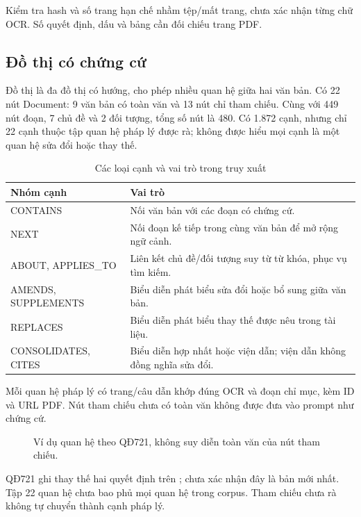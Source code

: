 Kiểm tra hash và số trang hạn chế nhầm tệp/mất trang, chưa xác nhận từng chữ OCR. Số quyết định, dấu và bảng cần đối chiếu trang PDF.

\subsection{Đồ thị có chứng cứ}
Đồ thị là đa đồ thị có hướng, cho phép nhiều quan hệ giữa hai văn bản. Có 22 nút Document: 9 văn bản có toàn văn và 13 nút chỉ tham chiếu. Cùng với 449 nút đoạn, 7 chủ đề và 2 đối tượng, tổng số nút là 480. Có 1.872 cạnh, nhưng chỉ 22 cạnh thuộc tập quan hệ pháp lý được rà; không được hiểu mọi cạnh là một quan hệ sửa đổi hoặc thay thế.

\begin{table}[H]
\centering\small
\caption{Các loại cạnh và vai trò trong truy xuất}
\begin{tabularx}{\textwidth}{l X}
\toprule Nhóm cạnh & Vai trò\\
\midrule
CONTAINS & Nối văn bản với các đoạn có chứng cứ.\\
NEXT & Nối đoạn kế tiếp trong cùng văn bản để mở rộng ngữ cảnh.\\
ABOUT, APPLIES\_TO & Liên kết chủ đề/đối tượng suy từ từ khóa, phục vụ tìm kiếm.\\
AMENDS, SUPPLEMENTS & Biểu diễn phát biểu sửa đổi hoặc bổ sung giữa văn bản.\\
REPLACES & Biểu diễn phát biểu thay thế được nêu trong tài liệu.\\
CONSOLIDATES, CITES & Biểu diễn hợp nhất hoặc viện dẫn; viện dẫn không đồng nghĩa sửa đổi.\\
\bottomrule
\end{tabularx}
\end{table}

Mỗi quan hệ pháp lý có trang/câu dẫn khớp đúng OCR và đoạn chỉ mục, kèm ID và URL PDF. Nút tham chiếu chưa có toàn văn không được đưa vào prompt như chứng cứ.

\begin{figure}[H]
\centering
{}
\caption{Ví dụ quan hệ theo QĐ721, không suy diễn toàn văn của nút tham chiếu.}
\end{figure}

QĐ721 ghi thay thế hai quyết định trên \cite{qd721}; chưa xác nhận đây là bản mới nhất. Tập 22 quan hệ chưa bao phủ mọi quan hệ trong corpus. Tham chiếu chưa rà không tự chuyển thành cạnh pháp lý.
